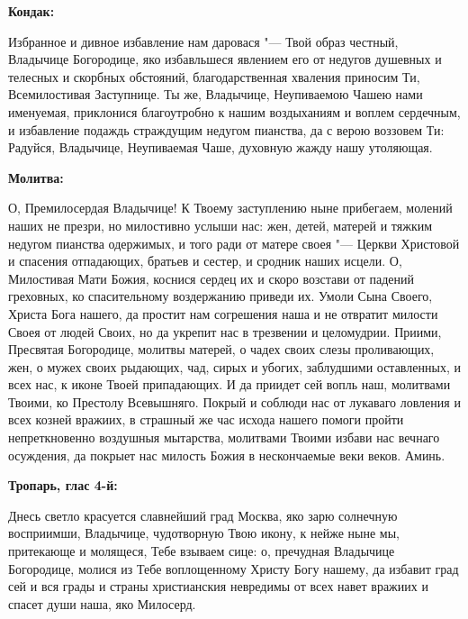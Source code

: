\medskip


\bfseries Кондак:\normalfont{}\nopagebreak


Избранное и дивное избавление нам даровася "--- Твой образ честный, Владычице Богородице, яко избавльшеся явлением его от недугов душевных и телесных и скорбных обстояний, благодарственная хваления приносим Ти, Всемилостивая Заступнице. Ты же, Владычице, Неупиваемою Чашею нами именуемая, приклонися благоутробно к нашим воздыханиям и воплем сердечным, и избавление подаждь страждущим недугом пианства, да с верою воззовем Ти: Радуйся, Владычице, Неупиваемая Чаше, духовную жажду нашу утоляющая.


\medskip


\bfseries Молитва:\normalfont{}\nopagebreak


О, Премилосердая Владычице! К Твоему заступлению ныне прибегаем, молений наших не презри, но милостивно услыши нас: жен, детей, матерей и тяжким недугом пианства одержимых, и того ради от матере своея "--- Церкви Христовой и спасения отпадающих, братьев и сестер, и сродник наших исцели. О, Милостивая Мати Божия, коснися сердец их и скоро возстави от падений греховных, ко спасительному воздержанию приведи их. Умоли Сына Своего, Христа Бога нашего, да простит нам согрешения наша и не отвратит милости Своея от людей Своих, но да укрепит нас в трезвении и целомудрии. Приими, Пресвятая Богородице, молитвы матерей, о чадех своих слезы проливающих, жен, о мужех своих рыдающих, чад, сирых и убогих, заблудшими оставленных, и всех нас, к иконе Твоей припадающих. И да приидет сей вопль наш, молитвами Твоими, ко Престолу Всевышняго. Покрый и соблюди нас от лукаваго ловления и всех козней вражиих, в страшный же час исхода нашего помоги пройти непреткновенно воздушныя мытарства, молитвами Твоими избави нас вечнаго осуждения, да покрыет нас милость Божия в нескончаемые веки веков. Аминь.


\medskip\mychapterending

 

\bfseries Тропарь, глас 4-й:\normalfont{}\nopagebreak


Днесь светло красуется славнейший град Москва, яко зарю солнечную восприимши, Владычице, чудотворную Твою икону, к нейже ныне мы, притекающе и молящеся, Тебе взываем сице: о, пречудная Владычице Богородице, молися из Тебе воплощенному Христу Богу нашему, да избавит град сей и вся грады и страны христианския невредимы от всех навет вражиих и спасет души наша, яко Милосерд. 


